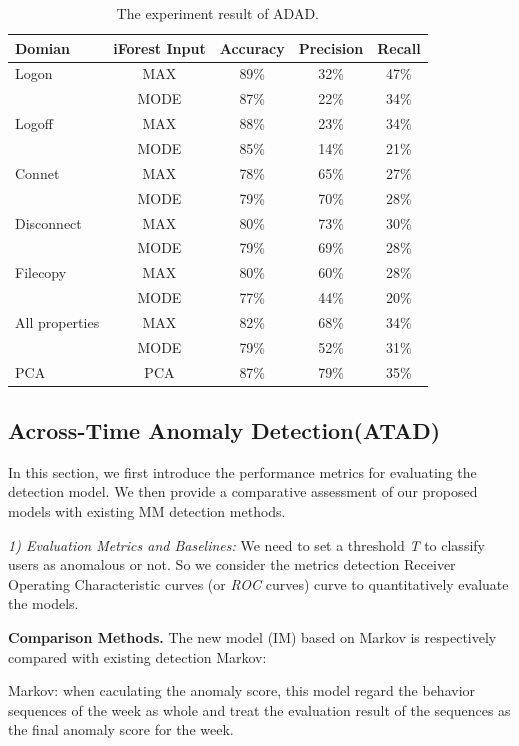 \documentclass[conference]{IEEEtran}
\begin{document}
\begin{table}[tbp]
\caption{The experiment result of ADAD.}
\centering  %
\begin{tabular}{lcccc}  %
\hline
Domian  &iForest Input &Accuracy &Precision &Recall\\ \hline
	
Logon 	& MAX &89\% &32\% &47\%\\
  & MODE &87\% &22\% &34\%\\\hline
Logoff 	& MAX &88\% &23\% &34\%\\
   & MODE &85\% &14\% &21\%\\\hline
Connet 	& MAX &78\% &65\% &27\%\\
  & MODE &79\% &70\% &28\%\\\hline
Disconnect 	& MAX &80\% &73\% &30\%\\
  & MODE &79\% &69\% &28\%\\\hline
Filecopy 	& MAX &80\% &60\% &28\%\\
  & MODE &77\% &44\% &20\%\\\hline
All properties 	& MAX &82\% &68\% &34\%\\
  & MODE &79\% &52\% &31\%\\\hline
PCA 	&PCA  &87\% &79\% &35\%\\\hline

\end{tabular}

\end{table}


\subsection{Across-Time Anomaly Detection(ATAD)}
In this section, we first introduce the performance metrics for
evaluating the detection model. We then provide a
comparative assessment of our proposed models with existing MM detection methods.

\emph{1) Evaluation Metrics and Baselines:}
We need to set a threshold \emph{T} to classify users as anomalous or not. 
So we consider the metrics detection Receiver
Operating Characteristic curves (or \emph{ROC} curves) curve to quantitatively evaluate the models.\cite{b17}

\textbf{Comparison Methods.}
The new model (IM) based on Markov is respectively compared with existing detection Markov:

Markov\cite{b21}: when caculating the anomaly score, this model regard the behavior sequences of the week as whole and treat the evaluation result of the sequences as the final anomaly score for the week.
\end{document}
